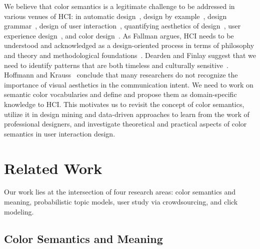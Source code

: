 \documentclass[prodmode,acmtochi]{acmsmall}
\begin{document}
We believe that color semantics is a legitimate challenge to be addressed in various venues of HCI: in automatic design~\cite{lok2001survey,gajos2004supple,hurst2009review,jahanian2012automatic,hunter2011web,Kuhna2012semi}, design by example~\cite{hartmann2008design,herring2009getting,lee2010designing,kumar2011bricolage}, design grammar~\cite{talton2012learning}, design of user interaction~\cite{carroll1997human,fallman2003design,lowgren2007pliability,zimmerman2007research,forlizzi2008crafting,stolterman2008nature,hashim2009design,chen2011interface}, quantifying aesthetics of design~\cite{lavie2004assessing,datta2006studying,reinecke2013predicting}, user experience design~\cite{hassenzahl2006user,mahlke2008visual,hartmann2008framing,lowgren2009toward,law2011measurability,bargas2011old,van2012user}, and color design~\cite{luo2006applying,tokumaru2002color,tsai2007automatic,wang2008color,ou2009colour,hsiao2013consultation,jahanian2013automatic}. 
As Fallman argues, HCI needs to be understood and acknowledged as a design-oriented process in terms of philosophy and theory and methodological foundations~\cite{fallman2003design}. Dearden and Finlay suggest that we need to identify patterns that are both timeless and culturally sensitive~\cite{dearden2006pattern}. Hoffmann and Krauss~\cite{hoffmann2004critical} conclude that many researchers do not recognize the importance of visual aesthetics in the communication intent.
We need to work on semantic color vocabularies and define and propose them as domain-specific knowledge to HCI.
This motivates us to revisit the concept of color semantics, utilize it in design mining and data-driven approaches to learn from the work of professional designers, and investigate theoretical and practical aspects of color semantics in user interaction design.


\section{Related Work}
\label{sec:RelatedWork}
Our work lies at the intersection of four research areas: color
semantics and meaning, probabilistic topic models, user study via
crowdsourcing, and click modeling.


\subsection{Color Semantics and Meaning}
\end{document}
